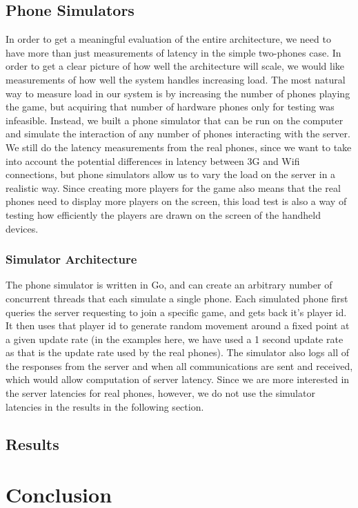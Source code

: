 \documentclass{acm_proc_article-sp}
\begin{document}
\subsection{Phone Simulators}
In order to get a meaningful evaluation of the entire architecture, we
need to have more than just measurements of latency in the simple
two-phones case.  In order to get a clear picture of how well the
architecture will scale, we would like measurements of how well the
system handles increasing load.  The most natural way to measure load
in our system is by increasing the number of phones playing the game,
but acquiring that number of hardware phones only for testing was
infeasible.  Instead, we built a phone simulator that can be run on
the computer and simulate the interaction of any number of phones
interacting with the server. We still do the latency measurements from
the real phones, since we want to take into account the potential
differences in latency between 3G and Wifi connections, but phone
simulators allow us to vary the load on the server in a realistic
way. Since creating more players for the game also means that the real
phones need to display more players on the screen, this load test is
also a way of testing how efficiently the players are drawn on the
screen of the handheld devices.

\subsubsection{Simulator Architecture}
The phone simulator is written in Go, and can create an arbitrary
number of concurrent threads that each simulate a single phone.  Each
simulated phone first queries the server requesting to join a specific
game, and gets back it's player id.  It then uses that player id to
generate random movement around a fixed point at a given update rate
(in the examples here, we have used a 1 second update rate as that is
the update rate used by the real phones). The simulator also logs all
of the responses from the server and when all communications are sent
and received, which would allow computation of server latency.  Since
we are more interested in the server latencies for real phones,
however, we do not use the simulator latencies in the results in the
following section.

\subsection{Results}

\section{Conclusion}
\end{document}
